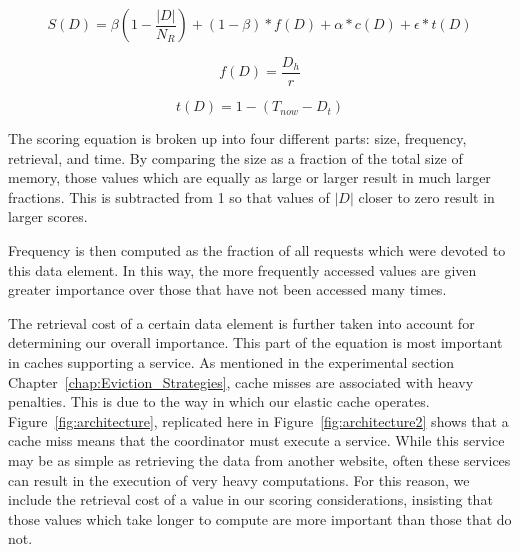 \begin{equation}
	S(D) = \beta \left(1 - \frac{|D|}{N_R}\right) + (1 - \beta) * f(D) +
	\alpha*c(D) + \epsilon * t(D)
\label{eqn:scoring}
\end{equation}

\begin{equation}
	f(D) = \frac{D_h}{r}
\label{eqn:frequency}
\end{equation}

\begin{equation}
	t(D) = 1 - (T_{now} - D_t)
\label{eqn:time}
\end{equation}

The scoring equation is broken up into four different parts: size, frequency,
retrieval, and time. By comparing the size as a fraction of the total size of
memory, those values which are equally as large or larger result in much larger
fractions. This is subtracted from 1 so that values of $|D|$ closer to zero
result in larger scores.

Frequency is then computed as the fraction of all requests which were devoted
to this data element. In this way, the more frequently accessed values are
given greater importance over those that have not been accessed many times.

The retrieval cost of a certain data element is further taken into account for
determining our overall importance. This part of the equation is most important in
caches supporting a service. As mentioned in the experimental section
Chapter~\ref{chap:Eviction_Strategies}, cache misses are associated with heavy
penalties. This is due to the way in which our elastic cache operates.
Figure~\ref{fig:architecture}, replicated here in
Figure~\ref{fig:architecture2} shows that a cache miss means that the
coordinator must execute a service. While this service may be as simple as
retrieving the data from another website, often these services can result in
the execution of very heavy computations. For this reason, we include the
retrieval cost of a value in our scoring considerations, insisting that those
values which take longer to compute are more important than those that do not.

